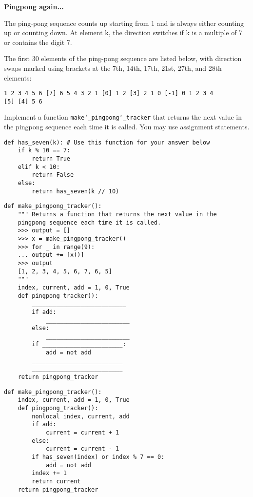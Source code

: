 \begin{blocksection}
\question \textbf{Pingpong again...}\\
\begin{nonsol}
The ping-pong sequence counts up starting from 1 and is
always either counting up or counting down. At element k, the direction switches if k is a multiple of 7 or contains the
digit 7. 

The first 30 elements of the ping-pong sequence are listed below, with direction
swaps marked using brackets at the 7th, 14th, 17th, 21st, 27th, and 28th
elements:
\begin{lstlisting}
1 2 3 4 5 6 [7] 6 5 4 3 2 1 [0] 1 2 [3] 2 1 0 [-1] 0 1 2 3 4
[5] [4] 5 6
\end{lstlisting}
\end{nonsol}

Implement a function \texttt{make\char`_pingpong\char`_tracker} that returns the
next value in the pingpong sequence each time it is called. You may use assignment statements.
\newline

\begin{lstlisting}
def has_seven(k): # Use this function for your answer below
    if k % 10 == 7:
        return True
    elif k < 10:
        return False
    else:
        return has_seven(k // 10)
\end{lstlisting}

\begin{nonsol}
\begin{lstlisting}
def make_pingpong_tracker():
    """ Returns a function that returns the next value in the
    pingpong sequence each time it is called.
    >>> output = []
    >>> x = make_pingpong_tracker()
    >>> for _ in range(9):
    ... output += [x()]
    >>> output
    [1, 2, 3, 4, 5, 6, 7, 6, 5]
    """
    index, current, add = 1, 0, True
    def pingpong_tracker():
        ___________________________
        if add:
            ________________________
        else:
            ________________________
        if _______________________:
            add = not add
        __________________________
        __________________________
    return pingpong_tracker
\end{lstlisting}
\end{nonsol}

\begin{solution}
\begin{lstlisting}
def make_pingpong_tracker():
    index, current, add = 1, 0, True
    def pingpong_tracker():
        nonlocal index, current, add
        if add:
            current = current + 1
        else:
            current = current - 1
        if has_seven(index) or index % 7 == 0:
            add = not add
        index += 1
        return current
    return pingpong_tracker
\end{lstlisting}
\end{solution}

\end{blocksection}


